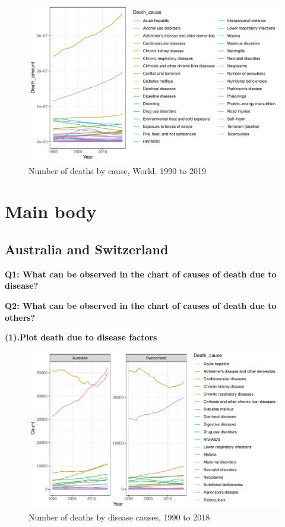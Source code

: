 \documentclass[11pt,a4paper,]{article}
\begin{document}
\begin{figure}
\centering
\includegraphics{Assignment4_files/figure-latex/worldplot-1.pdf}
\caption{\label{fig:worldplot}Number of deaths by cause, World, 1990 to 2019}
\end{figure}

\clearpage

\hypertarget{main-body}{%
\section{Main body}\label{main-body}}

\hypertarget{australia-and-switzerland}{%
\subsection{Australia and Switzerland}\label{australia-and-switzerland}}

\textbf{Q1: What can be observed in the chart of causes of death due to disease?}

\textbf{Q2: What can be observed in the chart of causes of death due to others?}

\textbf{(1).Plot death due to disease factors}

\begin{figure}
\centering
\includegraphics{Assignment4_files/figure-latex/diseaseplot-1.pdf}
\caption{\label{fig:diseaseplot}Number of deaths by disease causes, 1990 to 2018}
\end{figure}
\end{document}
